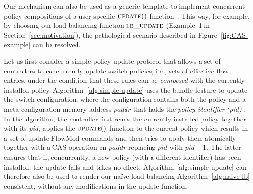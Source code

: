 \documentclass[conference]{sigcomm-alternate}
\newcommand{\paddr}{\textit{paddr}\xspace}
\newcommand{\pid}{\textit{pid}\xspace}
\newcommand{\ufunc}{update} %
\newcommand{\petr}[1]{\textit{\textcolor{blue}{[petr]: #1}}} %
\newcommand{\execatomic}{\textbf{execute-atomic}}
\begin{document}





Our mechanism can also be used as a generic template to
implement concurrent policy compositions of a user-specific
$\textsc{\ufunc}()$ function~\cite{stn}.
This way, for example, by choosing our load-balancing
function $\textsc{lb\_update}$ (Example~1 in
Section~\ref{sec:motivation}), 
the pathological scenario described in 
Figure~\ref{fig:CAS-example} can be resolved.

Let us first  consider a simple policy update protocol that
allows a set of  controllers to concurrently update switch policies, i.e., sets of
effective flow entries, under the
condition that these rules can be \emph{composed} with the currently installed
policy.
Algorithm~\ref{alg:simple-update} uses the bundle feature to update
the switch configuration, where the configuration contains both the
policy and a meta-configuration memory address $\paddr$ that holds the \emph{policy identifier (pid)} .
In the algorithm, the controller first reads the currently installed
policy together with its {\pid},  applies the
$\textsc{\ufunc}()$ function to the current policy which results in a
set of update FlowMod commands and then tries to apply them
atomically together with a CAS operation on $\paddr$ replacing $\pid$
with $\pid+1$.
The latter ensures that if, concurrently, a new policy (with a different identifier) has been installed, the update
fails and takes no effect.
Algorithm~\ref{alg:simple-update} can therefore also be used
to render our na\"ive load-balancing Algorithm~\ref{alg:naive-lb}
consistent, without any modifications in the update function.
\end{document}

